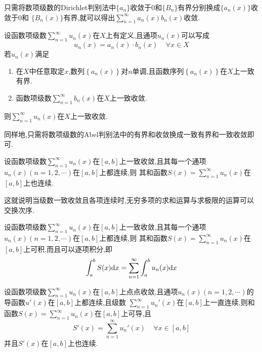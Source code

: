\documentclass{ctexart}
\begin{document}
只需将数项级数的Dirichlet判别法中$\{a_n\}$收敛于$0$和$\{B_n\}$有界分别换成$\{a_n(x)\}$收敛于$0$和%
$\{B_n(x)\}$有界,就可以得出$\displaystyle\sum_{n=1}^\infty a_n(x)b_n(x)$收敛.
\begin{formal}[3.6 Abel判别法]
    设函数项级数$\displaystyle\sum_{n=1}^\infty u_n(x)$在$X$上有定义,且通项$u_n(x)$可以写成
    \[u_n(x)=a_n(x)\cdot b_n(x)\ \ \ \ \ \forall x\in X\]
    若$u_n(x)$满足
    \begin{enumerate}[label=\tbf{\arabic*.}]
        \item 在$X$中任意取定$x$,数列$\left\{a_n(x)\right\}$对$n$单调,且函数序列$\left\{a_n(x)\right\}$在$X$上一致有界.
        \item 函数项级数$\displaystyle\sum_{n=1}^{\infty}b_n(x)$在$X$上一致收敛.
    \end{enumerate}
    则$\displaystyle\sum_{n=1}^\infty u_n(x)$在$X$上一致收敛.
\end{formal}\noindent
同样地,只需将数项级数的Abel判别法中的有界和收敛换成一致有界和一致收敛即可.\\
\begin{formal}[4.1 和函数的连续性]
    设函数项级数$\displaystyle\sum_{n=1}^\infty u_n(x)$在$[a,b]$上一致收敛,且其每一个通项$u_n(x)(n=1,2,\cdots)$在$[a,b]$上都连续,则%
    其和函数$S(x)=\displaystyle\sum_{n=1}^\infty u_n(x)$在$[a,b]$上也连续.
\end{formal}\noindent
这就说明当级数一致收敛且各项连续时,无穷多项的求和运算与求极限的运算可以交换次序.
\begin{formal}[4.2 逐项求积分]
    设函数项级数$\displaystyle\sum_{n=1}^\infty u_n(x)$在$[a,b]$上一致收敛,且其每一个通项$u_n(x)(n=1,2,\cdots)$在$[a,b]$上都连续,则%
    其和函数$S(x)=\displaystyle\sum_{n=1}^\infty u_n(x)$在$[a,b]$上可积,而且可以逐项积分,即
    \[\int_a^b S(x)\mathrm{d} x=\sum_{n=1}^\infty\int_a^b u_n(x)\mathrm{d} x\]
\end{formal}
\begin{formal}[4.3 逐项求导]
    设函数项级数$\displaystyle\sum_{n=1}^\infty u_n(x)$在$[a,b]$上点点收敛,且通项$u_n(x)(n=1,2,\cdots)$的导函数$u'(x)$在$[a,b]$上都连续,且级数%
    $\displaystyle\sum_{n=1}^\infty u_n'(x)$在$[a,b]$上一直连续,则和函数$S(x)=\displaystyle\sum_{n=1}^\infty u_n(x)$在$[a,b]$上可导,且
    \[S'(x)=\sum_{n=1}^\infty u_n'(x)\ \ \ \ \ \forall x\in[a,b]\]
    并且$S'(x)$在$[a,b]$上也连续.
\end{formal}
\end{document}
